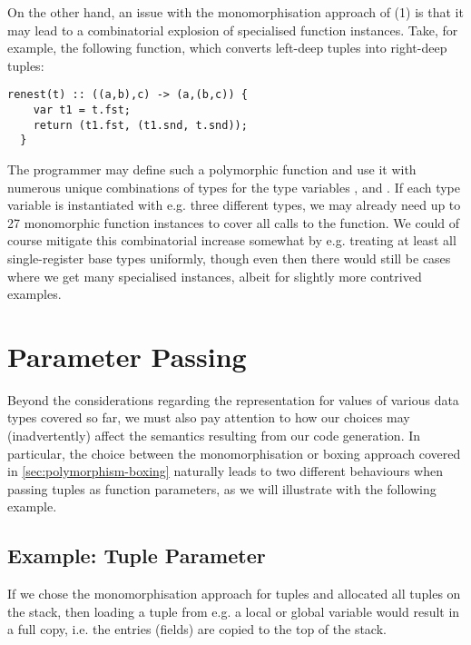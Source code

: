 On the other hand, an issue with the monomorphisation approach of (1) is that it
may lead to a combinatorial explosion of specialised function instances.
Take, for example, the following function, which converts left-deep tuples into
right-deep tuples:
\begin{lstlisting}[language=spl]
  renest(t) :: ((a,b),c) -> (a,(b,c)) {
    var t1 = t.fst;
    return (t1.fst, (t1.snd, t.snd));
  }
\end{lstlisting}
%
The programmer may define such a polymorphic function and use it with numerous
unique combinations of types for the type variables ,  and
. If each type variable is instantiated with e.g. three different types,
we may already need up to 27 monomorphic function instances to cover all calls
to the  function.
We could of course mitigate this combinatorial increase somewhat by e.g.
treating at least all single-register base types uniformly, though even then
there would still be cases where we get many specialised instances, albeit for
slightly more contrived examples.


\section{Parameter Passing}
Beyond the considerations regarding the representation for values of various
data types covered so far, we must also pay attention to how our choices may
(inadvertently) affect the semantics resulting from our code generation.
In particular, the choice between the monomorphisation or boxing approach
covered in \cref{sec:polymorphism-boxing} naturally leads to two different
behaviours when passing tuples as function parameters, as we will illustrate
with the following example.

\subsection{Example: Tuple Parameter}
If we chose the monomorphisation approach for tuples and allocated all tuples on
the stack, then loading a tuple from e.g. a local or global variable would
result in a full copy, i.e. the entries (fields) are copied to
the top of the stack.

